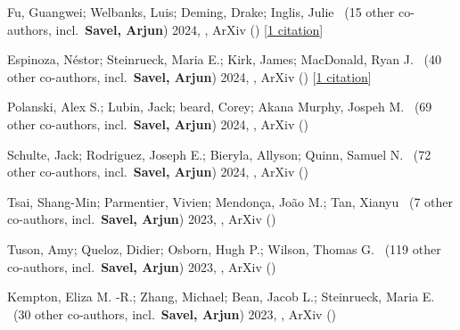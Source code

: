 \item[{\color{numcolor}\scriptsize14}] Fu, Guangwei; Welbanks, Luis; Deming, Drake; Inglis, Julie \etal\ ({15} other co-authors, incl.\ \textbf{Savel, Arjun}) 2024, , ArXiv () [\href{https://ui.adsabs.harvard.edu/abs/2024arXiv240706163F}{1 citation}]

\item[{\color{numcolor}\scriptsize13}] Espinoza, N{\'e}stor; Steinrueck, Maria E.; Kirk, James; MacDonald, Ryan J. \etal\ ({40} other co-authors, incl.\ \textbf{Savel, Arjun}) 2024, , ArXiv () [\href{https://ui.adsabs.harvard.edu/abs/2024arXiv240710294E}{1 citation}]

\item[{\color{numcolor}\scriptsize12}] Polanski, Alex S.; Lubin, Jack; beard, Corey; Akana Murphy, Jospeh M. \etal\ ({69} other co-authors, incl.\ \textbf{Savel, Arjun}) 2024, , ArXiv ()

\item[{\color{numcolor}\scriptsize11}] Schulte, Jack; Rodriguez, Joseph E.; Bieryla, Allyson; Quinn, Samuel N. \etal\ ({72} other co-authors, incl.\ \textbf{Savel, Arjun}) 2024, , ArXiv ()

\item[{\color{numcolor}\scriptsize10}] Tsai, Shang-Min; Parmentier, Vivien; Mendon{\c{c}}a, Jo{\~a}o M.; Tan, Xianyu \etal\ ({7} other co-authors, incl.\ \textbf{Savel, Arjun}) 2023, , ArXiv ()

\item[{\color{numcolor}\scriptsize9}] Tuson, Amy; Queloz, Didier; Osborn, Hugh P.; Wilson, Thomas G. \etal\ ({119} other co-authors, incl.\ \textbf{Savel, Arjun}) 2023, , ArXiv ()

\item[{\color{numcolor}\scriptsize8}] Kempton, Eliza M. -R.; Zhang, Michael; Bean, Jacob L.; Steinrueck, Maria E. \etal\ ({30} other co-authors, incl.\ \textbf{Savel, Arjun}) 2023, , ArXiv ()

